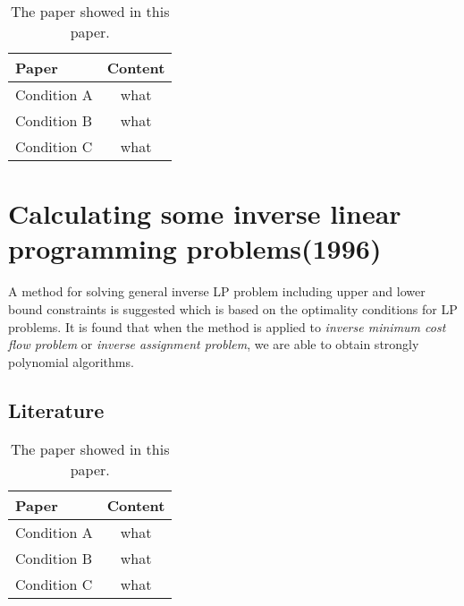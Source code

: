 \documentclass[UTF8]{article}
\begin{document}
\begin{table}[ht]

\tabcolsep=70pt

\small\renewcommand{}

\caption{The paper showed in this paper.\label{tab:1}}

{\begin{tabular}{lc}
\hline
Paper & Content \\
\hline
Condition A & what \\
\hline
Condition B & what \\
\hline
Condition C & what \\
\hline
\end{tabular}}
{}
\end{table}


\section{Calculating some inverse linear programming problems(1996)}

A method for solving general inverse LP problem including upper and lower bound constraints is suggested which is based on the optimality conditions for LP problems. It is found that when the method is applied to \emph{inverse minimum cost flow problem} or \emph{inverse assignment problem}, we are able to obtain strongly polynomial algorithms.


\subsection{Literature}

\begin{table}[ht]

\tabcolsep=70pt

\small\renewcommand{}

\caption{The paper showed in this paper.\label{tab:1}}

{\begin{tabular}{lc}
\hline
Paper & Content \\
\hline
Condition A & what \\
\hline
Condition B & what \\
\hline
Condition C & what \\
\hline
\end{tabular}}
{}
\end{table}
\end{document}
